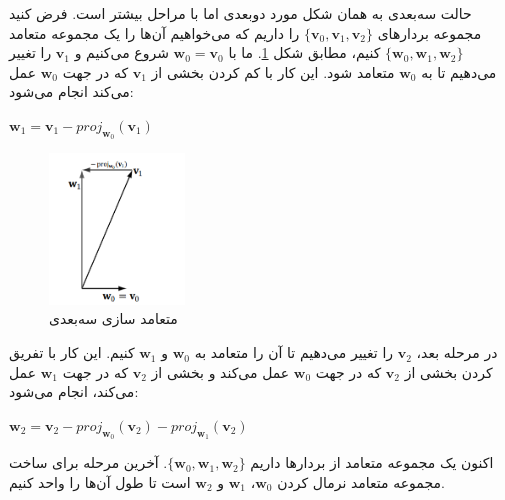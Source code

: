 {\begin{spacing}{1.5}
        حالت سه‌بعدی به همان شکل مورد دو‌بعدی اما با مراحل بیشتر است.
        فرض کنید مجموعه بردارهای $\{\textbf{v}_{0},\textbf{v}_{1},\textbf{v}_{2}\}$ را داریم که می‌خواهیم آن‌ها را یک مجموعه متعامد $\{\textbf{w}_{0},\textbf{w}_{1},\textbf{w}_{2}\}$ کنیم، مطابق شکل \ref{fig:4.Session.1.1.12}.
        ما با $\textbf{w}_{0}=\textbf{v}_{0}$ شروع می‌کنیم و $\textbf{v}_{1}$ را تغییر می‌دهیم تا به $\textbf{w}_{0}$ متعامد شود.
        این کار با کم کردن بخشی از $\textbf{v}_{1}$ که در جهت $\textbf{w}_{0}$ عمل می‌کند انجام می‌شود:

        \begin{center}
            $\textbf{w}_{1}=\textbf{v}_{1}-proj_{\textbf{w}_{0}}(\textbf{v}_{1})$
        \end{center}

        \begin{figure}[H]
            \centering
            \setlength{\belowcaptionskip}{-10pt}
            \includegraphics[width=0.32\textwidth]{Images/4/1/4.Session.1.1.12}
            \caption{متعامد سازی سه‌بعدی}
            \label{fig:4.Session.1.1.12}
        \end{figure}

        در مرحله بعد، $\textbf{v}_{2}$ را تغییر می‌دهیم تا آن را متعامد به $\textbf{w}_{0}$ و $\textbf{w}_{1}$ کنیم.
        این کار با تفریق کردن بخشی از $\textbf{v}_{2}$ که در جهت $\textbf{w}_{0}$ عمل می‌کند و بخشی از $\textbf{v}_{2}$ که در جهت $\textbf{w}_{1}$ عمل می‌کند، انجام می‌شود:

        \begin{center}
            $\textbf{w}_{2}=\textbf{v}_{2}-proj_{\textbf{w}_{0}}(\textbf{v}_{2})-proj_{\textbf{w}_{1}}(\textbf{v}_{2})$
        \end{center}

        اکنون یک مجموعه متعامد از بردارها داریم $\{\textbf{w}_{0},\textbf{w}_{1},\textbf{w}_{2}\}$.
        آخرین مرحله برای ساخت مجموعه متعامد نرمال کردن $\textbf{w}_{0}$، $\textbf{w}_{1}$ و $\textbf{w}_{2}$ است تا طول آن‌ها را واحد کنیم.


\end{spacing}}
